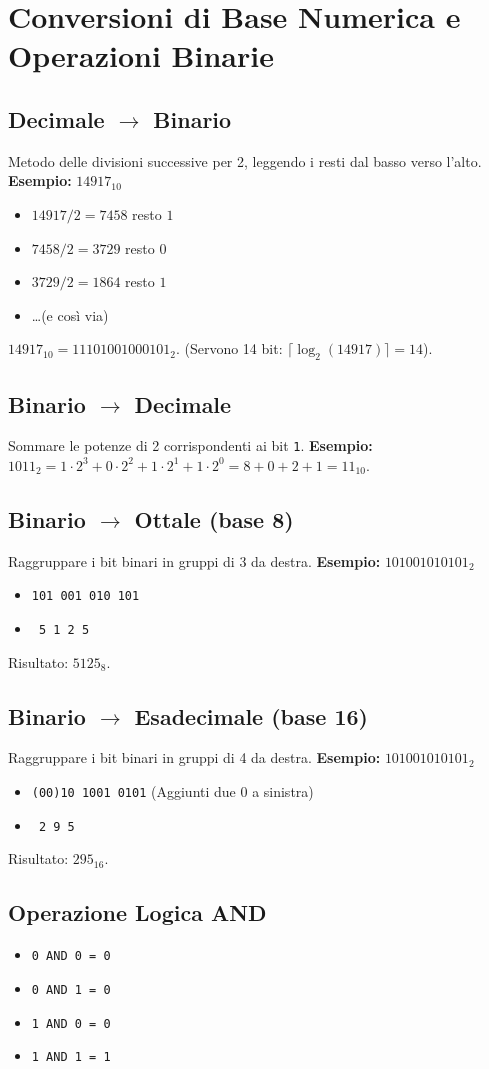 \section{Conversioni di Base Numerica e Operazioni Binarie}

\subsection{\texorpdfstring{Decimale $\rightarrow$ Binario}{Decimale -> Binario}}
Metodo delle divisioni successive per 2, leggendo i resti dal basso verso l'alto.
\textbf{Esempio:} $14917_{10}$
\begin{itemize}
    \item $14917 / 2 = 7458$ resto $1$
    \item $7458 / 2 = 3729$ resto $0$
    \item $3729 / 2 = 1864$ resto $1$
    \item \dots (e così via)
\end{itemize}
$14917_{10} = 11101001000101_2$. (Servono 14 bit: $\lceil \log_2(14917) \rceil = 14$).

\subsection{\texorpdfstring{Binario $\rightarrow$ Decimale}{Binario -> Decimale}}
Sommare le potenze di 2 corrispondenti ai bit \texttt{1}.
\textbf{Esempio:} $1011_2 = 1 \cdot 2^3 + 0 \cdot 2^2 + 1 \cdot 2^1 + 1 \cdot 2^0 = 8 + 0 + 2 + 1 = 11_{10}$.

\subsection{\texorpdfstring{Binario $\rightarrow$ Ottale (base 8)}{Binario -> Ottale (base 8)}}
Raggruppare i bit binari in gruppi di 3 da destra.
\textbf{Esempio:} $101001010101_2$
\begin{itemize}
    \item \texttt{101 001 010 101}
    \item \texttt{ 5   1   2   5 }
\end{itemize}
Risultato: $5125_8$.

\subsection{\texorpdfstring{Binario $\rightarrow$ Esadecimale (base 16)}{Binario -> Esadecimale (base 16)}}
Raggruppare i bit binari in gruppi di 4 da destra.
\textbf{Esempio:} $101001010101_2$
\begin{itemize}
    \item \texttt{(00)10 1001 0101} (Aggiunti due 0 a sinistra)
    \item \texttt{   2    9    5  }
\end{itemize}
Risultato: $295_{16}$.

\subsection{Operazione Logica AND}
\begin{itemize}
    \item \texttt{0 AND 0 = 0}
    \item \texttt{0 AND 1 = 0}
    \item \texttt{1 AND 0 = 0}
    \item \texttt{1 AND 1 = 1}
\end{itemize}


